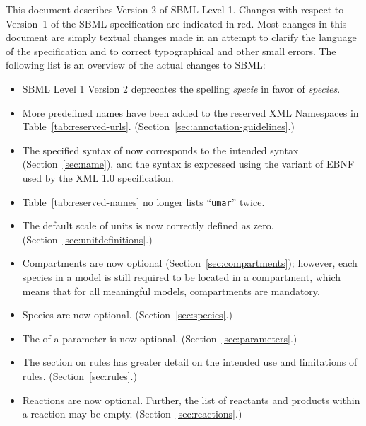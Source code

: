 \documentclass[10pt]{cekarticle}
\newcommand{\vref}[1]{\ref{#1}}
\newenvironment{blockChanged}{\color{BrickRed}}{}
\begin{document}
\begin{blockChanged}
  This document describes Version 2 of SBML Level 1.  Changes with respect
  to Version~1 of the SBML specification are indicated in red.  Most
  changes in this document are simply textual changes made in an attempt to
  clarify the language of the specification and to correct typographical
  and other small errors.  The following list is an overview of the actual
  changes to SBML:
\vspace*{-0.85ex}\begin{itemize}\setlength{\parskip}{0.55ex}
  
\item SBML Level 1 Version 2 deprecates the spelling \emph{specie} 
  in favor of \emph{species}.
  
\item More predefined names have been added to the reserved XML Namespaces
      in Table~\ref{tab:reserved-urls}. (Section~\ref{sec:annotation-guidelines}.)

\item The specified syntax of  now corresponds to the intended
  syntax (Section~\ref{sec:name}), and the syntax is expressed using the
  variant of EBNF used by the XML 1.0 specification.

\item Table~\vref{tab:reserved-names} no longer lists ``\texttt{umar}'' twice.

\item The default scale of units is now correctly defined as zero.
  (Section~\ref{sec:unitdefinitions}.)
  
\item Compartments are now optional (Section~\ref{sec:compartments});
  however, each species in a model is still required to be located in a
  compartment, which means that for all meaningful models, compartments are
  mandatory.

\item Species are now optional.  (Section~\ref{sec:species}.)

\item The  of a parameter is now optional.
  (Section~\ref{sec:parameters}.)
  
\item The section on rules has greater detail on the intended use and
  limitations of rules.  (Section~\ref{sec:rules}.)
  
\item Reactions are now optional.  Further, the list of reactants and
  products within a reaction may be empty.  (Section~\ref{sec:reactions}.)
  

\end{itemize}
\end{blockChanged}
\end{document}
